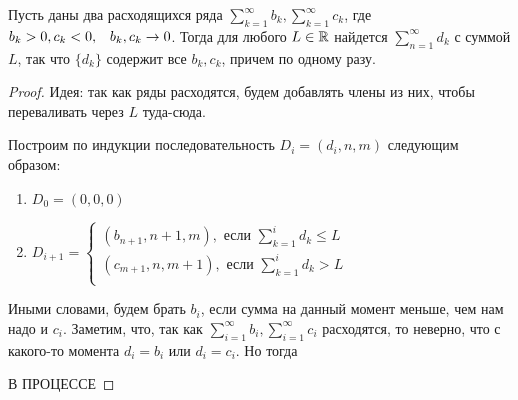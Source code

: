 \begin{lemma}
    Пусть даны два расходящихся ряда \(\sum_{k = 1}^\infty b_k, \sum_{k = 1}^\infty c_k\), где \(b_k > 0, c_k < 0,\;\;\;b_k, c_k \rightarrow 0\). Тогда для любого \(L \in \mathbb{R}\) найдется \(\sum_{n = 1}^\infty d_k\) с суммой \(L\), так что \(\{d_k\}\) содержит все \(b_k, c_k\), причем по одному разу.
\end{lemma}
\begin{proof}
    Идея: так как ряды расходятся, будем добавлять члены из них, чтобы переваливать через \(L\) туда-сюда. %

    Построим по индукции последовательность \(D_i = (d_i, n, m)\) следующим образом:
    \begin{enumerate}
        \item[] \(D_0 = (0, 0, 0)\)
        \item[] \(D_{i + 1} = \left\{\begin{array}{l}
            (b_{n + 1}, n + 1, m), \text{ если }\sum_{k = 1}^i d_k \le L \\
            (c_{m + 1}, n, m + 1), \text{ если }\sum_{k = 1}^i d_k > L \\
        \end{array}\right.\)
    \end{enumerate}
    Иными словами, будем брать \(b_i\), если сумма на данный момент меньше, чем нам надо и \(c_i\).
    Заметим, что, так как \(\sum_{i = 1}^\infty b_i, \sum_{i = 1}^\infty c_i\) расходятся, то неверно, что с какого-то момента \(d_i = b_i\) или \(d_i = c_i\). Но тогда 

    В ПРОЦЕССЕ

\end{proof}